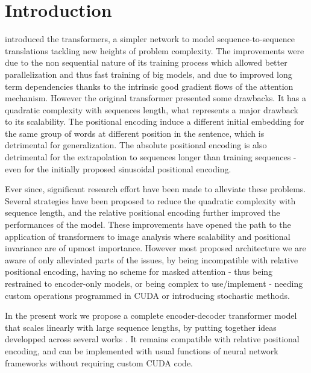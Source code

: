 \section{\label{sec:introduction}Introduction}

\citet{vaswani2017attention} introduced the transformers, a simpler network to model sequence-to-sequence translations tackling new heights of problem complexity. The improvements were due to the non sequential nature of its training process which allowed better parallelization and thus fast training of big models, and due to improved long term dependencies thanks to the intrinsic good gradient flows of the attention mechanism. However the original transformer presented some drawbacks. It has a quadratic complexity with sequences length, what represents a major drawback to its scalability. The positional encoding induce a different initial embedding for the same group of words at different position in the sentence, which is detrimental for generalization. The absolute positional encoding is also detrimental for the extrapolation to sequences longer than training sequences - even for the initially proposed sinusoidal positional encoding.

Ever since, significant research effort have been made to alleviate these problems. Several strategies have been proposed to reduce the quadratic complexity with sequence length, and the relative positional encoding further improved the performances of the model. These improvements have opened the path to the application of transformers to image analysis where scalability and positional invariance are of upmost importance. However most proposed architecture we are aware of only alleviated parts of the issues, by being incompatible with relative positional encoding, having no scheme for masked attention - thus being restrained to encoder-only models, or being complex to use/implement - needing custom operations programmed in CUDA or introducing stochastic methods.

In the present work we propose a complete encoder-decoder transformer model that scales linearly with large sequence lengths, by putting together ideas developped across several works \cite{vaswani2017attention,shen2020efficient,katharopoulos2020transformers,choromanski2021rethinking,shaw2018selfattention,horn2021translational}. It remains compatible with relative positional encoding, and can be implemented with usual functions of neural network frameworks without requiring custom CUDA code.

\endinput
